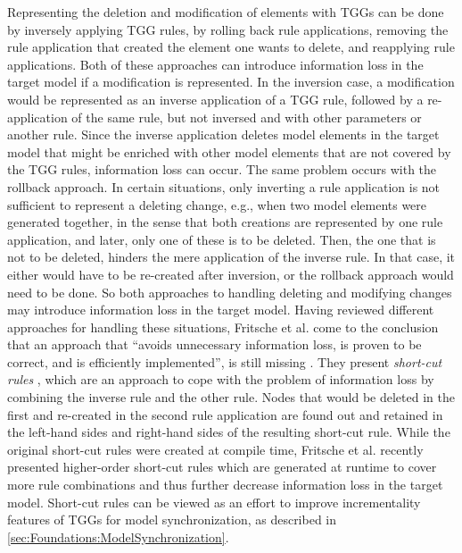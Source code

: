 Representing the deletion and modification of elements with TGGs can be done by inversely applying TGG rules, by rolling back rule applications, removing the rule application that created the element one wants to delete, and reapplying rule applications. Both of these approaches can introduce information loss in the target model if a modification is represented. In the inversion case, a modification would be represented as an inverse application of a TGG rule, followed by a re-application of the same rule, but not inversed and with other parameters or another rule. Since the inverse application deletes model elements in the target model that might be enriched with other model elements that are not covered by the TGG rules, information loss can occur. The same problem occurs with the rollback approach.
In certain situations, only inverting a rule application is not sufficient to represent a deleting change, e.g., when two model elements were generated together, in the sense that both creations are represented by one rule application, and later, only one of these is to be deleted. Then, the one that is not to be deleted, hinders the mere application of the inverse rule. In that case, it either would have to be re-created after inversion, or the rollback approach would need to be done. 
So both approaches to handling deleting and modifying changes may introduce information loss in the target model.
Having reviewed different approaches for handling these situations, Fritsche et al. come to the conclusion that an approach that \enquote{avoids unnecessary information loss, is proven to be correct, and is efficiently implemented}, is still missing \cite{fritsche_short-cut-rules-repair-tgg_2021}.
They present \emph{short-cut rules} \cite{fritsche_short-cut-theoretical_2018, fritsche_short-cut-rules-repair-tgg_2021}, which are an approach to cope with the problem of information loss by combining the inverse rule and the other rule. Nodes that would be deleted in the first and re-created in the second rule application are found out and retained in the left-hand sides and right-hand sides of the resulting short-cut rule.
While the original short-cut rules were created at compile time, Fritsche et al. recently presented higher-order short-cut rules \cite{fritsche_higher_order_short_cut_rules_2023} which are generated at runtime to cover more rule combinations and thus further decrease information loss in the target model.
Short-cut rules can be viewed as an effort to improve incrementality features of TGGs for model synchronization, as described in \autoref{sec:Foundations:ModelSynchronization}.

